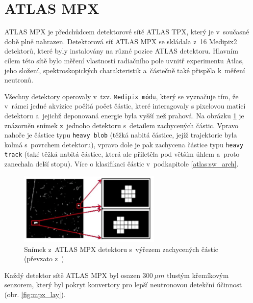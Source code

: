 \section{ATLAS MPX}\label{atlas:mpx}
ATLAS MPX\cite{Vykydal200935}\cite{atlasmpx} je předchůdcem detektorové sítě ATLAS TPX, který je v~současné době plně nahrazen. Detektorová síť ATLAS MPX se skládala z~16 Medipix2 detektorů, které byly instalovány na různé pozice ATLAS detektoru. Hlavním cílem této sítě bylo měření vlastností radiačního pole uvnitř experimentu Atlas, jeho složení, spektroskopických charakteristik a~částečně také přispěla k~měření neutronů. 

Všechny detektory operovaly v~tzv. \texttt{Medipix módu}, který se vyznačuje tím, že v~rámci jedné akvizice počítá počet částic, které interagovaly s pixelovou maticí detektoru a~jejichž deponovaná energie byla vyšší než prahová. Na obrázku \ref{fig:mpx_cluster} je znázorněn snímek z~jednoho detektoru s~detailem zachycených částic. Vpravo nahoře je částice typu \texttt{heavy blob} (těžká nabitá částice, jejíž trajektorie byla kolmá s~povrchem detektoru), vpravo dole je pak zachycena částice typu \texttt{heavy track} (také těžká nabitá částice, která ale přiletěla pod větším úhlem a~proto zanechala delší stopu). Více o klasifikaci částic v~podkapitole \ref{atlas:sw_arch}.


\begin{figure}[ht]
	\begin{center}
		\includegraphics[width=7cm]{figures/mpx_cluster.png}
		\caption{Snímek z~ATLAS MPX detektoru s~výřezem zachycených částic (převzato z~\cite{atlasmpx})}
		\label{fig:mpx_cluster}
	\end{center}
\end{figure}


Každý detektor sítě ATLAS MPX byl osazen $300~\mu m$ tlustým křemíkovým senzorem, který byl pokryt konvertory pro lepší neutronovou detekční účinnost (obr. \ref{fig:mpx_lay}).

